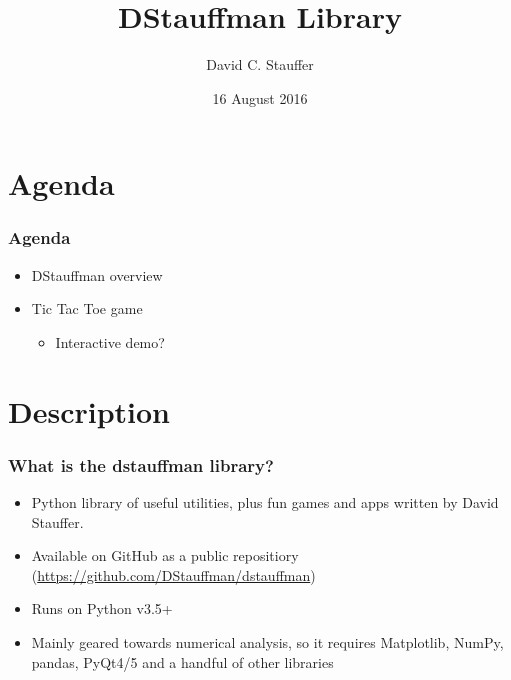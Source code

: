 \documentclass{beamer}
\title{DStauffman Library}
\author{David C. Stauffer}
\date{16 August 2016}
\begin{document}
\begin{frame}
\titlepage
\end{frame}

\section{Agenda}
\begin{frame}
	\frametitle{Agenda}
    \begin{itemize}
        \item DStauffman overview
        \item Tic Tac Toe game
        \begin{itemize}
            \item Interactive demo?
        \end{itemize}
    \end{itemize}
\end{frame}


\section{Description}
\begin{frame}
	\frametitle{What is the dstauffman library?}
    \begin{itemize}
        \item Python library of useful utilities, plus fun games and apps written by David Stauffer.
        \item Available on GitHub as a public repositiory (\url{https://github.com/DStauffman/dstauffman})
        \item Runs on Python v3.5+
        \item Mainly geared towards numerical analysis, so it requires Matplotlib, NumPy, pandas, PyQt4/5 and a handful of other libraries
    \end{itemize}
\end{frame}
\end{document}
